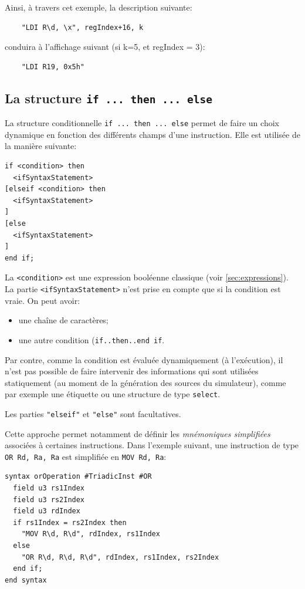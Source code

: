 Ainsi, à travers cet exemple, la description suivante:
\begin{lstlisting}
    "LDI R\d, \x", regIndex+16, k
\end{lstlisting}
conduira à l'affichage suivant (si k=5, et regIndex = 3):
\begin{verbatim}
    "LDI R19, 0x5h"
\end{verbatim}

\subsection{La structure \texttt{if ... then ... else}}
\label{sec:syntaxIf}
La structure conditionnelle \texttt{if ... then ... else} permet de faire un choix dynamique en fonction des différents champs d'une instruction. Elle est utilisée de la manière suivante:
\begin{lstlisting}
if <condition> then
  <ifSyntaxStatement>
[elseif <condition> then
  <ifSyntaxStatement>
]
[else 
  <ifSyntaxStatement>
]
end if;
\end{lstlisting}

La \texttt{<condition>} est une expression booléenne classique (voir \ref{sec:expressions}).
La partie \texttt{<ifSyntaxStatement>} n'est prise en compte que si la condition est vraie. On peut avoir:
\begin{itemize}
\item une chaîne de caractères;
\item une autre condition (\texttt{if..then..end if}.
\end{itemize}

Par contre, comme la condition est évaluée dynamiquement (à l'exécution), il n'est pas possible de faire intervenir des informations qui sont utilisées statiquement (au moment de la génération des sources du simulateur), comme par exemple une étiquette ou une structure de type \texttt{select}.

Les parties {\tt "elseif"} et {\tt "else"} sont facultatives.

Cette approche permet notamment de définir les \emph{mnémoniques simplifiées} associées à certaines instructions. Dans l'exemple suivant, une instruction de type \texttt{OR Rd, Ra, Ra} est simplifiée en \texttt{MOV Rd, Ra}:
\begin{lstlisting}
syntax orOperation #TriadicInst #OR
  field u3 rs1Index
  field u3 rs2Index
  field u3 rdIndex
  if rs1Index = rs2Index then
    "MOV R\d, R\d", rdIndex, rs1Index
  else
    "OR R\d, R\d, R\d", rdIndex, rs1Index, rs2Index
  end if;
end syntax
\end{lstlisting}

